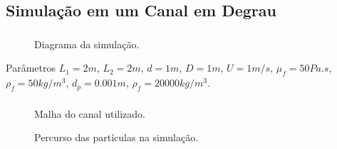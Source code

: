 \documentclass{beamer}
\begin{document}
\subsection*{Simulação em um Canal em Degrau}
\begin{frame}
  \frametitle{\subsecname}
  
  \begin{figure}
     {\raggedleft \tiny Diagrama da simulação.}
  \end{figure}
  \begin{block}{Parâmetros}
    $L_1=2m$, $L_2=2m$, $d=1m$, $D=1m$, $U=1m/s$, $\mu_f=50Pa.s$, $\rho_f=50kg/m^3$, $d_p=0.001m$, $\rho_f=20000kg/m^3$.
  \end{block}
\end{frame}

\begin{frame}
  \frametitle{\subsecname}
  
  \begin{figure}
     {\raggedleft \tiny Malha do canal utilizado.}
  \end{figure}
  \vspace*{-\baselineskip}\setlength\belowdisplayshortskip{0pt} %
  \begin{figure}
     {\raggedleft \tiny Percurso das partículas na simulação.}
  \end{figure}
\end{frame}
\end{document}
